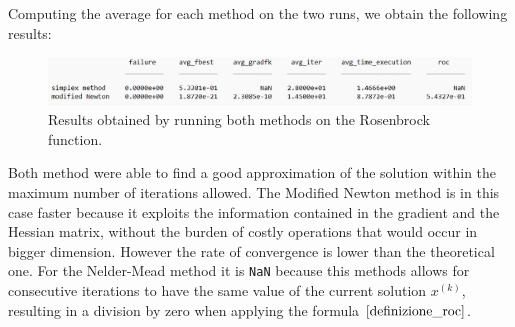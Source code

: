 Computing the average for each method on the two runs, we obtain the following results:
\begin{figure}[H]
    \centering
    \includegraphics[width=\textwidth]{img/es2_table.png}
    \caption{Results obtained by running both methods on the Rosenbrock function.} 
    \label{pb 2 table}
\end{figure}
Both method were able to find a good approximation of the solution within the maximum number 
of iterations allowed. The Modified Newton method is in this case faster because it exploits 
the information contained in the gradient and the Hessian matrix, without the burden of costly 
operations that would occur in bigger dimension. However the rate of convergence is lower than the
theoretical one. For the Nelder-Mead method it is \texttt{NaN} because this methods allows for 
consecutive iterations to have the same value of the current solution $x^{(k)}$, resulting in a 
division by zero when applying the formula $\eqref{definizione_roc}$.
